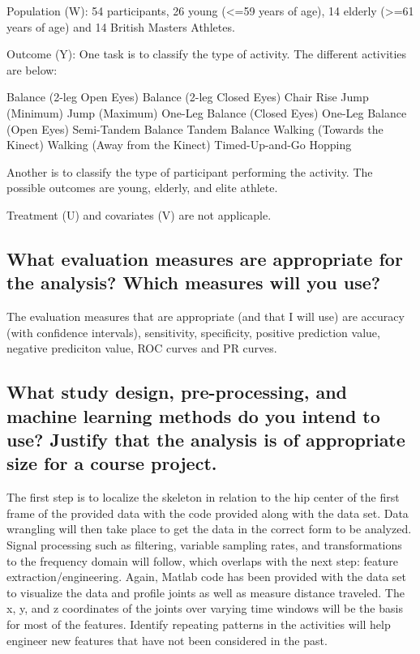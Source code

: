 \documentclass[twoside,11pt]{article}
\begin{document}
Population (W): 54 participants, 26 young (<=59 years of age), 14 elderly (>=61 years of age) and 14 British Masters Athletes.

Outcome (Y): One task is to classify the type of activity. The different activities are below:

  Balance (2-leg Open Eyes)
  Balance (2-leg Closed Eyes)
  Chair Rise
  Jump (Minimum)
  Jump (Maximum)
  One-Leg Balance (Closed Eyes)
  One-Leg Balance (Open Eyes)
  Semi-Tandem Balance
  Tandem Balance
  Walking (Towards the Kinect)
  Walking (Away from the Kinect)
  Timed-Up-and-Go
  Hopping
  
  Another is to classify the type of participant performing the activity. The possible outcomes are young, elderly, and elite athlete.
  
Treatment (U) and covariates (V) are not applicaple.

\subsection{What evaluation measures are appropriate for the analysis? Which measures will you use?}

 The evaluation measures that are appropriate (and that I will use) are accuracy (with confidence intervals), sensitivity, specificity, positive prediction value, negative prediciton value, ROC curves and PR curves.

\subsection{What study design, pre-processing, and machine learning methods do you intend to use? Justify that the analysis is of appropriate size for a course project.}

  The first step is to localize the skeleton in relation to the hip center of the first frame of the provided data with the code provided along with the data set\citep{cite7}. Data wrangling will then take place to get the data in the correct form to be analyzed. Signal processing such as filtering, variable sampling rates, and transformations to the frequency domain will follow, which overlaps with the next step: feature extraction/engineering. Again, Matlab code has been provided with the data set to visualize the data and profile joints as well as measure distance traveled. The x, y, and z coordinates of the joints over varying time windows will be the basis for most of the features. Identify repeating patterns in the activities will help engineer new features that have not been considered in the past.
  
\end{document}
